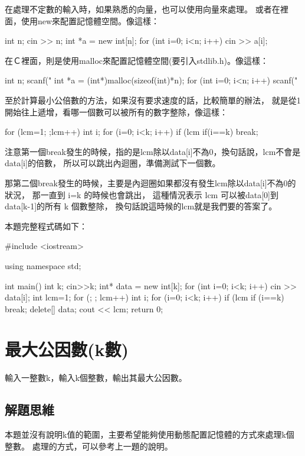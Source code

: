 在處理不定數的輸入時，如果熟悉\cc{}的向量，也可以使用向量來處理。
或者在\cc{}裡面，使用new來配置記憶體空間。像這樣：
\begin{inside}
	int n;  cin >> n;
	int *a = new int[n];
	for (int i=0; i<n; i++) cin >> a[i];
\end{inside}

在Ｃ裡面，則是使用malloc來配置記憶體空間(要引入stdlib.h)。像這樣：
\begin{inside}
	int n;  scanf("%
	int *a = (int*)malloc(sizeof(int)*n);
	for (int i=0; i<n; i++) scanf("%
\end{inside}

至於計算最小公倍數的方法，如果沒有要求速度的話，比較簡單的辦法，
就是從1開始往上遞增，看哪一個數可以被所有的數字整除，像這樣：
\begin{inside}
	for (lcm=1; ;lcm++) {
		int i;
		for (i=0; i<k; i++) {
			if (lcm%
		}
		if(i==k) break;
	}
\end{inside}
注意第一個break發生的時候，指的是lcm除以data[i]不為0，換句話說，lcm不會是data[i]的倍數，
所以可以跳出內迴圈，準備測試下一個數。

那第二個break發生的時候，主要是內迴圈如果都沒有發生lcm除以data[i]不為0的狀況，
那一直到 i=k 的時候也會跳出，
這種情況表示 lcm 可以被data[0]到data[k-1]的所有 k 個數整除，
換句話說這時候的lcm就是我們要的答案了。

本題完整程式碼如下：	
\begin{cppcode}
#include <iostream>

using namespace std;

int main()
{
	int k; cin>>k;
	int* data = new int[k];
	for (int i=0; i<k; i++) cin >> data[i];
	int lcm=1;
	for (; ; lcm++) {
		int i;
		for (i=0; i<k; i++) {
			if (lcm%
		}
		if (i==k) break;
	}
	delete[] data;
	cout << lcm;
	return 0;
}
\end{cppcode}


\section{最大公因數(k數)}
輸入一整數k，輸入k個整數，輸出其最大公因數。

\subsection{解題思維}
本題並沒有說明k值的範圍，主要希望能夠使用動態配置記憶體的方式來處理k個整數。
處理的方式，可以參考上一題的說明。

